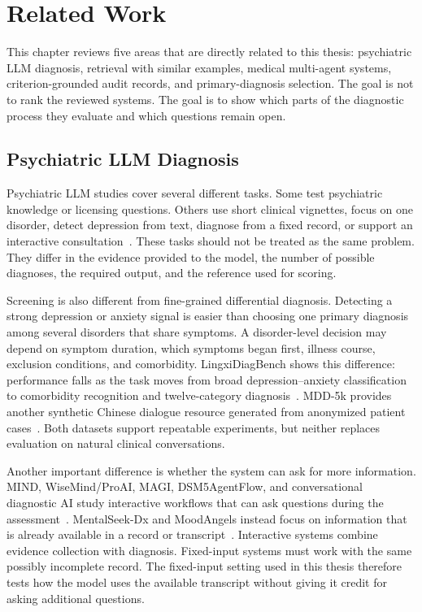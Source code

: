 \chapter{Related Work}
\label{ch:related}

This chapter reviews five areas that are directly related to this thesis: psychiatric LLM diagnosis, retrieval with similar examples, medical multi-agent systems, criterion-grounded audit records, and primary-diagnosis selection. The goal is not to rank the reviewed systems. The goal is to show which parts of the diagnostic process they evaluate and which questions remain open.

\section{Psychiatric LLM Diagnosis}

Psychiatric LLM studies cover several different tasks. Some test psychiatric knowledge or licensing questions. Others use short clinical vignettes, focus on one disorder, detect depression from text, diagnose from a fixed record, or support an interactive consultation~\citep{qiu2023largeai,li2024taiwan,raballo2025,sarma2025,li2025addreview,mcduff2025amie}. These tasks should not be treated as the same problem. They differ in the evidence provided to the model, the number of possible diagnoses, the required output, and the reference used for scoring.

Screening is also different from fine-grained differential diagnosis. Detecting a strong depression or anxiety signal is easier than choosing one primary diagnosis among several disorders that share symptoms. A disorder-level decision may depend on symptom duration, which symptoms began first, illness course, exclusion conditions, and comorbidity. LingxiDiagBench shows this difference: performance falls as the task moves from broad depression--anxiety classification to comorbidity recognition and twelve-category diagnosis~\citep{xu2026lingxidiagbench}. MDD-5k provides another synthetic Chinese dialogue resource generated from anonymized patient cases~\citep{yin2024mdd5k}. Both datasets support repeatable experiments, but neither replaces evaluation on natural clinical conversations.

Another important difference is whether the system can ask for more information. MIND, WiseMind/ProAI, MAGI, DSM5AgentFlow, and conversational diagnostic AI study interactive workflows that can ask questions during the assessment~\citep{li2026mind,wu2026wisemind,bi2025magi,ozgun2025dsm5agentflow,tu2025conversational}. MentalSeek-Dx and MoodAngels instead focus on information that is already available in a record or transcript~\citep{sun2026mentalseek,xiao2025moodangels}. Interactive systems combine evidence collection with diagnosis. Fixed-input systems must work with the same possibly incomplete record. The fixed-input setting used in this thesis therefore tests how the model uses the available transcript without giving it credit for asking additional questions.

